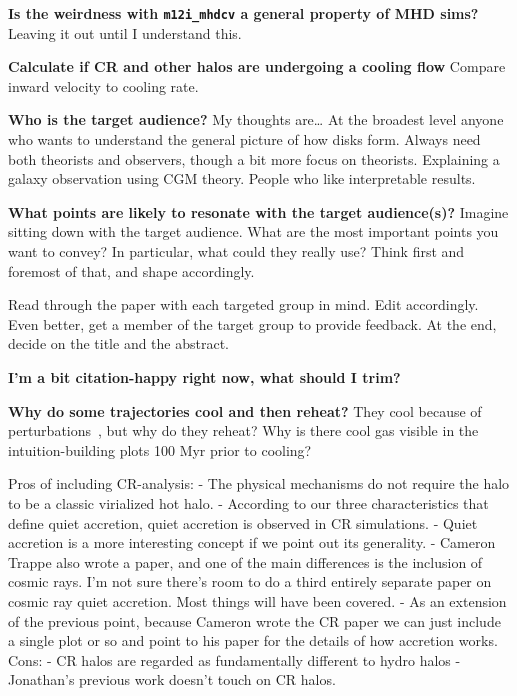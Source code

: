 \documentclass[fleqn,usenatbib]{mnras}
\begin{document}
\textbf{Is the weirdness with \texttt{m12i\_mhdcv} a general property of MHD sims?}
Leaving it out until I understand this.

\textbf{Calculate if CR and other halos are undergoing a cooling flow}
Compare inward velocity to cooling rate.

\textbf{
Who is the target audience?
}
My thoughts are\ldots
At the broadest level anyone who wants to understand the general picture of how disks form.
Always need both theorists and observers, though a bit more focus on theorists.
Explaining a galaxy observation using CGM theory.
People who like interpretable results.

\textbf{What points are likely to resonate with the target audience(s)?}
Imagine sitting down with the target audience.
What are the most important points you want to convey?
In particular, what could they really use?
Think first and foremost of that, and shape accordingly.

Read through the paper with each targeted group in mind.
Edit accordingly.
Even better, get a member of the target group to provide feedback.
At the end, decide on the title and the abstract.

\textbf{I'm a bit citation-happy right now, what should I trim?}

\textbf{Why do some trajectories cool and then reheat?}
They cool because of perturbations~\citep{Esmerian2020}, but why do they reheat?
Why is there cool gas visible in the intuition-building plots 100 Myr prior to cooling?

Pros of including CR-analysis:
- The physical mechanisms do not require the halo to be a classic virialized hot halo.
- According to our three characteristics that define quiet accretion, quiet accretion is observed in CR simulations.
- Quiet accretion is a more interesting concept if we point out its generality.
- Cameron Trappe also wrote a paper, and one of the main differences is the inclusion of cosmic rays. I'm not sure there's room to do a third entirely separate paper on cosmic ray quiet accretion. Most things will have been covered.
- As an extension of the previous point, because Cameron wrote the CR paper we can just include a single plot or so and point to his paper for the details of how accretion works.
Cons:
- CR halos are regarded as fundamentally different to hydro halos
- Jonathan's previous work doesn't touch on CR halos.
\end{document}
